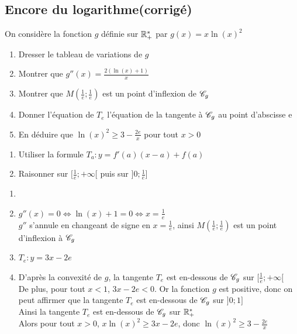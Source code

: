 \documentclass[oneside,12pt]{book}          %
\begin{document}
\subsection{Encore du logarithme\quad\small{(corrigé)}}
On considère la fonction $g$ définie sur ${\mathbb R}_+^*$ par $g(x)=x\ln(x)^2$
\begin{enumerate}
    \item Dresser le tableau de variations de $g$
    \item Montrer que $g''(x)=\frac{2(\ln(x)+1)}{x}$
    \item Montrer que $M\left(\frac{1}{e};\frac{1}{e}\right)$ est un point d'inflexion de ${\mathscr{C}}_g$
    \item Donner l'équation de $T_e$ l'équation de la tangente à ${\mathscr{C}}_g$ au point d'abscisse e
    \item En déduire que $\ln(x)^2\geq3-\frac{2e}{x}$ pour tout $x>0$
\end{enumerate}

\begin{hint}
	\begin{enumerate}
		\item[4.] Utiliser la formule $T_a:y=f'(a)(x-a)+f(a)$
		\item[5.] Raisonner sur $[\frac{1}{e};+\infty[$ puis sur $]0;\frac{1}{e}]$
	\end{enumerate}
\end{hint}
\begin{sol}
	\begin{enumerate}
		\item {}
		\item[3.] $g''(x)=0\Leftrightarrow\ln(x)+1=0\Leftrightarrow x=\frac{1}{e}$\\
		$g''$ s'annule en changeant de signe en $x=\frac{1}{e}$, ainsi $M\left(\frac{1}{e};\frac{1}{e}\right)$ est un point d'inflexion à ${\mathscr{C}}_g$
		\item[4.] $T_e:y=3x-2e$
		\item[5.] D'après la convexité de $g$, la tangente $T_e$ est en-dessous de ${\mathscr{C}}_g$ sur $[\frac{1}{e};+\infty[$\\
		De plus, pour tout $x<1$, $3x-2e<0$. Or la fonction $g$ est positive, donc on peut affirmer que la tangente $T_e$ est en-dessous de ${\mathscr{C}}_g$ sur $]0;1]$\\
		Ainsi la tangente $T_e$ est en-dessous de ${\mathscr{C}}_g$ sur ${\mathbb R}_+^*$\\
		Alors pour tout $x>0$, $x\ln(x)^2\geq 3x-2e$, donc $\ln(x)^2\geq3-\frac{2e}{x}$
	\end{enumerate}
\end{sol}
\end{document}
